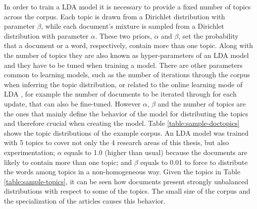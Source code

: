 In order to train a LDA model it is necessary to provide a fixed number of topics across the corpus. Each topic is drawn from a Dirichlet distribution with parameter $\beta$, while each document's mixture is sampled from a Dirichlet distribution with parameter $\alpha$. These two priors, $\alpha$ and $\beta$, set the probability that a document or a word, respectively, contain more than one topic. Along with the number of topics they are also known as hyper-parameters of an LDA model and they have to be tuned when training a model. There are other parameters common to learning models, such as the number of iterations through the corpus when inferring the topic distribution, or related to the online learning mode of LDA \citep{Blei2010}, for example the number of documents to be iterated through for each update, that can also be fine-tuned. However $\alpha$, $\beta$ and the number of topics are the ones that mainly define the behavior of the model for distributing the topics and therefore crucial when creating the model. Table \ref{table:sample-doctopics} shows the topic distributions of the example corpus. An LDA model was trained with 5 topics to cover not only the 4 research areas of this thesis, but also experimentation;  $\alpha$ equals to 1.0 (higher than usual) because the documents are likely to contain more than one topic; and $\beta$ equals to 0.01 to force to distribute the words among topics in a non-homogeneous way. Given the topics in Table \ref{table:sample-topics}, it can be seen how documents present strongly unbalanced distributions with respect to some of the topics. The small size of the corpus and the specialization of the articles causes this behavior.

